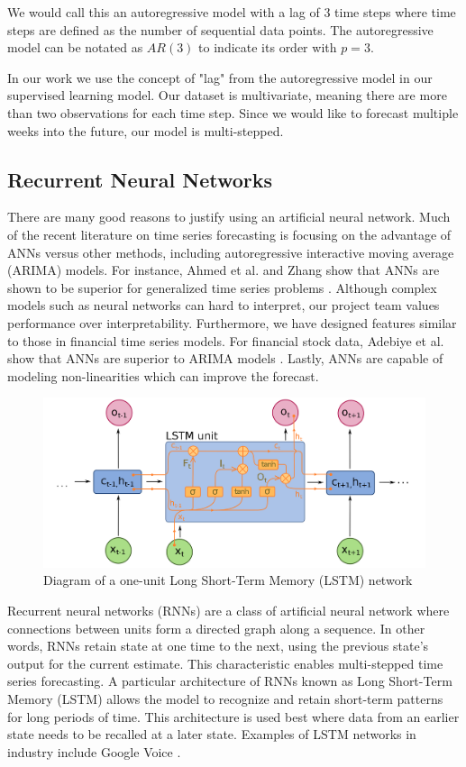 \documentclass[11pt, oneside]{article}
\begin{document}
We would call this an autoregressive model with a lag of 3 time steps where time steps are defined as the number of sequential data points. The autoregressive model can be notated as $AR(3)$ to indicate its order with $p=3$.

In our work we use the concept of "lag" from the autoregressive model in our supervised learning model. Our dataset is multivariate, meaning there are more than two observations for each time step. Since we would like to forecast multiple weeks into the future, our model is multi-stepped.

\subsection{Recurrent Neural Networks}

There are many good reasons to justify using an artificial neural network. Much of the recent literature on time series forecasting is focusing on the advantage of ANNs versus other methods, including autoregressive interactive moving average (ARIMA) models. For instance, Ahmed et al. and Zhang show that ANNs are shown to be superior for generalized time series problems \cite{ahmed et al.}. Although complex models such as neural networks can hard to interpret, our project team values performance over interpretability. Furthermore, we have designed features similar to those in financial time series models. For financial stock data, Adebiye et al. show that ANNs are superior to ARIMA models \cite{adebiye et al.}. Lastly, ANNs are capable of modeling non-linearities which can improve the forecast.

\begin{figure}[h]
  \caption{Diagram of a one-unit Long Short-Term Memory (LSTM) network \cite{deloche}}
  \centering
  \includegraphics[width=12.5cm]{images/Long_Short-Term_Memory.png}
\end{figure}

Recurrent neural networks (RNNs) are a class of artificial neural network where connections between units form a directed graph along a sequence. In other words, RNNs retain state at one time to the next, using the previous state's output for the current estimate. This characteristic enables multi-stepped time series forecasting. A particular architecture of RNNs known as Long Short-Term Memory (LSTM) allows the model to recognize and retain short-term patterns for long periods of time. This architecture is used best where data from an earlier state needs to be recalled at a later state. Examples of LSTM networks in industry include Google Voice \cite{beaufays}.
\end{document}
